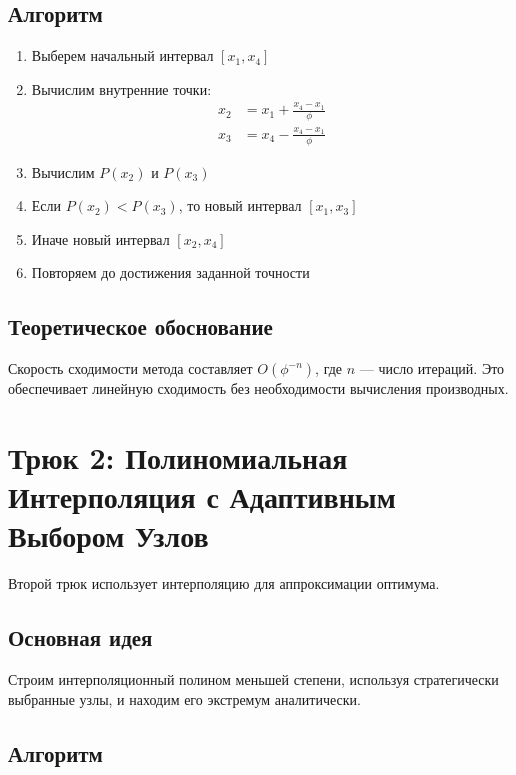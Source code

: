 \documentclass[12pt,a4paper]{article}
\begin{document}
\subsection{Алгоритм}

\begin{enumerate}
    \item Выберем начальный интервал $[x_1, x_4]$
    \item Вычислим внутренние точки:
    \begin{align}
        x_2 &= x_1 + \frac{x_4 - x_1}{\phi} \\
        x_3 &= x_4 - \frac{x_4 - x_1}{\phi}
    \end{align}
    \item Вычислим $P(x_2)$ и $P(x_3)$
    \item Если $P(x_2) < P(x_3)$, то новый интервал $[x_1, x_3]$
    \item Иначе новый интервал $[x_2, x_4]$
    \item Повторяем до достижения заданной точности
\end{enumerate}

\subsection{Теоретическое обоснование}

Скорость сходимости метода составляет $O(\phi^{-n})$, где $n$ --- число итераций. Это обеспечивает линейную сходимость без необходимости вычисления производных.

\section{Трюк 2: Полиномиальная Интерполяция с Адаптивным Выбором Узлов}

Второй трюк использует интерполяцию для аппроксимации оптимума.

\subsection{Основная идея}

Строим интерполяционный полином меньшей степени, используя стратегически выбранные узлы, и находим его экстремум аналитически.

\subsection{Алгоритм}
\end{document}
